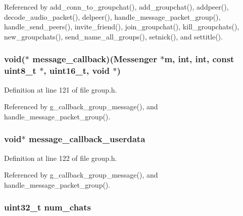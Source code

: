 Referenced by add\+\_\+conn\+\_\+to\+\_\+groupchat(), add\+\_\+groupchat(), addpeer(), decode\+\_\+audio\+\_\+packet(), delpeer(), handle\+\_\+message\+\_\+packet\+\_\+group(), handle\+\_\+send\+\_\+peers(), invite\+\_\+friend(), join\+\_\+groupchat(), kill\+\_\+groupchats(), new\+\_\+groupchats(), send\+\_\+name\+\_\+all\+\_\+groups(), setnick(), and settitle().

\hypertarget{struct_group___chats_a0f49e6a148c90647f5280d35d0f7a9d0}{
\subsubsection[{message\+\_\+callback}]{\setlength{\rightskip}{0pt plus 5cm}void($\ast$ message\+\_\+callback)({\bf Messenger} $\ast${\bf m}, int, int, const uint8\+\_\+t $\ast$, uint16\+\_\+t, void $\ast$)}}\label{struct_group___chats_a0f49e6a148c90647f5280d35d0f7a9d0}


Definition at line 121 of file group.\+h.



Referenced by g\+\_\+callback\+\_\+group\+\_\+message(), and handle\+\_\+message\+\_\+packet\+\_\+group().

\hypertarget{struct_group___chats_a593c4aa670d5dc3d9fcd842fb8d5a6fe}{
\subsubsection[{message\+\_\+callback\+\_\+userdata}]{\setlength{\rightskip}{0pt plus 5cm}void$\ast$ message\+\_\+callback\+\_\+userdata}}\label{struct_group___chats_a593c4aa670d5dc3d9fcd842fb8d5a6fe}


Definition at line 122 of file group.\+h.



Referenced by g\+\_\+callback\+\_\+group\+\_\+message(), and handle\+\_\+message\+\_\+packet\+\_\+group().

\hypertarget{struct_group___chats_af6dc2bcdf8d71e0faaa6601befa94d9b}{
\subsubsection[{num\+\_\+chats}]{\setlength{\rightskip}{0pt plus 5cm}uint32\+\_\+t num\+\_\+chats}}\label{struct_group___chats_af6dc2bcdf8d71e0faaa6601befa94d9b}


